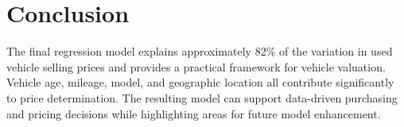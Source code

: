 \documentclass[
  12pt]{article}
\begin{document}
\section{Conclusion}\label{conclusion}

The final regression model explains approximately 82\% of the variation
in used vehicle selling prices and provides a practical framework for
vehicle valuation. Vehicle age, mileage, model, and geographic location
all contribute significantly to price determination. The resulting model
can support data-driven purchasing and pricing decisions while
highlighting areas for future model enhancement.



\end{document}
